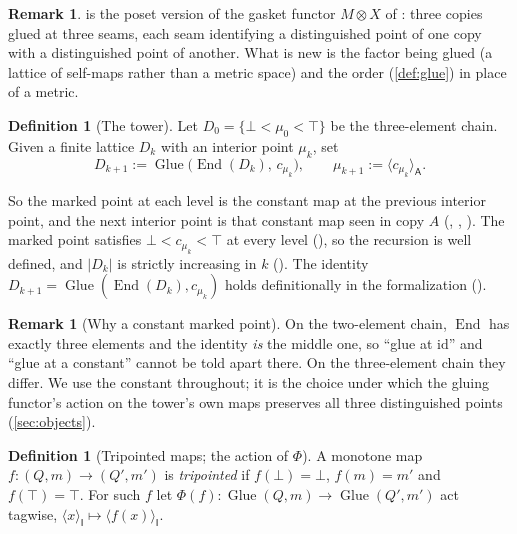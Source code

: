 \documentclass[11pt]{amsart}
\theoremstyle{plain}
\theoremstyle{definition}
\newtheorem{definition}[theorem]{Definition}
\newtheorem{remark}[theorem]{Remark}
\newcommand{\End}{\operatorname{End}}
\newcommand{\Glue}{\operatorname{Glue}}
\newcommand{\cst}[1]{c_{#1}}
\newcommand{\tg}[2]{\langle #1\rangle_{\mathsf{#2}}}
\newcommand{\id}{\mathrm{id}}
\begin{document}
\begin{remark}
 is the poset version of the gasket functor $M\otimes X$ of
\cite[Section~2.2]{RatnayakeEtAl2024}: three copies glued at three seams, each seam
identifying a distinguished point of one copy with a distinguished point of
another. What is new is the factor being glued (a lattice of self-maps rather
than a metric space) and the order (\cref{def:glue}) in place of a metric.
\end{remark}

\begin{definition}[The tower]\label{def:tower}
Let $D_0=\{\bot<\mu_0<\top\}$ be the three-element chain. Given a finite lattice
$D_k$ with an interior point $\mu_k$, set
\[
  D_{k+1}:=\Glue\bigl(\End(D_k),\,\cst{\mu_k}\bigr),\qquad
  \mu_{k+1}:=\tg{\cst{\mu_k}}{A}.
\]
\end{definition}

So the marked point at each level is the constant map at the previous interior
point, and the next interior point is that constant map seen in copy $A$
(, ,
). The marked point satisfies
$\bot<\cst{\mu_k}<\top$ at every level
(), so the recursion is
well defined, and $\bigl|D_k\bigr|$ is strictly increasing in $k$
(). The identity $D_{k+1}=
\Glue(\End(D_k),\cst{\mu_k})$ holds definitionally in the formalization
().

\begin{remark}[Why a constant marked point]
On the two-element chain, $\End$ has exactly three elements and the identity
\emph{is} the middle one, so ``glue at $\id$'' and ``glue at a constant'' cannot
be told apart there. On the three-element chain they differ. We use the
constant throughout; it is the choice under which the gluing functor's action
on the tower's own maps preserves all three distinguished points
(\cref{sec:objects}).
\end{remark}

\begin{definition}[Tripointed maps; the action of $\Phi$]\label{def:phi}
A monotone map $f\colon(Q,m)\to(Q',m')$ is \emph{tripointed} if $f(\bot)=\bot$,
$f(m)=m'$ and $f(\top)=\top$. For such $f$ let $\Phi(f)\colon\Glue(Q,m)\to
\Glue(Q',m')$ act tagwise, $\tg xI\mapsto\tg{f(x)}I$.
\end{definition}
\end{document}

